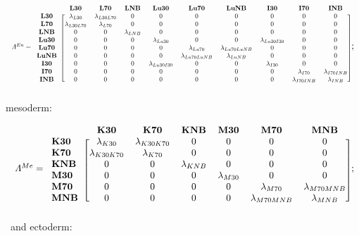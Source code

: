 \documentclass[
	a4paper, %
	10pt, %
	unnumberedsections, %
	twoside, %
]{LTJournalArticle}
\begin{document}
\[
\resizebox{\columnwidth}{!}{%
    $\varLambda^{En} = 
    \begin{blockarray}{*{10}{c}}
     & \mathbf{L30} & \mathbf{L70} & \mathbf{LNB} & \mathbf{Lu30} & \mathbf{Lu70} & \mathbf{LuNB} & \mathbf{I30} & \mathbf{I70} & \mathbf{INB} \\
    \begin{block}{c [ccccccccc]}
    \mathbf{L30} & \lambda_{L30} & \lambda_{L30L70} & 0 & 0 & 0 & 0 & 0 & 0 & 0 \\
    \mathbf{L70} & \lambda_{L30L70} & \lambda_{L70} & 0 & 0 & 0 & 0 & 0 & 0 & 0 \\
    \mathbf{LNB} & 0 & 0 & \lambda_{LNB} & 0 & 0 & 0 & 0 & 0 & 0 \\
    \mathbf{Lu30} & 0 & 0 & 0 & \lambda_{Lu30} & 0 & 0 & \lambda_{Lu30I30} & 0 & 0 \\
    \mathbf{Lu70} & 0 & 0 & 0 & 0 & \lambda_{Lu70} & \lambda_{Lu70LuNB} & 0 & 0 & 0 \\
    \mathbf{LuNB} & 0 & 0 & 0 & 0 & \lambda_{Lu70LuNB} & \lambda_{LuNB} & 0 & 0 & 0 \\
    \mathbf{I30} & 0 & 0 & 0 & \lambda_{Lu30I30} & 0 & 0 & \lambda_{I30} & 0 & 0 \\
    \mathbf{I70} & 0 & 0 & 0 & 0 & 0 & 0 & 0 & \lambda_{I70} & \lambda_{I70INB} \\
    \mathbf{INB} & 0 & 0 & 0 & 0 & 0 & 0 & 0 & \lambda_{I70INB} & \lambda_{INB} \\
    \end{block}
    \end{blockarray}$};
\]

\noindent mesoderm:

\[
\resizebox{\columnwidth}{!}{
	$\varLambda^{Me} = 
    \begin{blockarray}{l*{6}{c}}
     & \mathbf{K30} & \mathbf{K70} & \mathbf{KNB} & \mathbf{M30} & \mathbf{M70} & \mathbf{MNB} \\
    \begin{block}{l[cccccc]}
    \mathbf{K30} & \lambda_{K30} & \lambda_{K30K70} & 0 & 0 & 0 & 0 \\
    \mathbf{K70} & \lambda_{K30K70} & \lambda_{K70} & 0 & 0 & 0 & 0 \\
    \mathbf{KNB} & 0 & 0 & \lambda_{KNB} & 0 & 0 & 0 \\
    \mathbf{M30} & 0 & 0 & 0 & \lambda_{M30} & 0 & 0 \\
    \mathbf{M70} & 0 & 0 & 0 & 0 & \lambda_{M70} & \lambda_{M70MNB} \\
    \mathbf{MNB} & 0 & 0 & 0 & 0 & \lambda_{M70MNB} & \lambda_{MNB} \\
    \end{block}
    \end{blockarray}$};
\]\newline\ and ectoderm:
\end{document}
